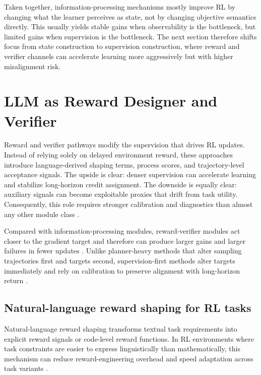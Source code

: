 \documentclass[pdflatex,sn-mathphys-num]{sn-jnl}
\begin{document}
Taken together, information-processing mechanisms mostly improve RL by changing what the learner perceives as state, not by changing objective semantics directly. This usually yields stable gains when observability is the bottleneck, but limited gains when supervision is the bottleneck. The next section therefore shifts focus from state construction to supervision construction, where reward and verifier channels can accelerate learning more aggressively but with higher misalignment risk.
\section{LLM as Reward Designer and Verifier}
Reward and verifier pathways modify the supervision that drives RL updates. Instead of relying solely on delayed environment reward, these approaches introduce language-derived shaping terms, process scores, and trajectory-level acceptance signals. The upside is clear: denser supervision can accelerate learning and stabilize long-horizon credit assignment. The downside is equally clear: auxiliary signals can become exploitable proxies that drift from task utility. Consequently, this role requires stronger calibration and diagnostics than almost any other module class \cite{arxiv_p_2310_12931,arxiv_p_2602_06493,arxiv_p_2602_12579,arxiv_p_2510_20867,arxiv_p_2512_05686,arxiv_p_2602_09367}.

Compared with information-processing modules, reward-verifier modules act closer to the gradient target and therefore can produce larger gains and larger failures in fewer updates \cite{arxiv_p_2205_12258,arxiv_p_2404_03648,arxiv_p_2602_00994}. Unlike planner-heavy methods that alter sampling trajectories first and targets second, supervision-first methods alter targets immediately and rely on calibration to preserve alignment with long-horizon return \cite{arxiv_p_2204_01691,arxiv_p_2305_16291,arxiv_p_2602_07848}.

\subsection{Natural-language reward shaping for RL tasks}
Natural-language reward shaping transforms textual task requirements into explicit reward signals or code-level reward functions. In RL environments where task constraints are easier to express linguistically than mathematically, this mechanism can reduce reward-engineering overhead and speed adaptation across task variants \cite{arxiv_p_2310_12931,arxiv_p_2309_11489,arxiv_p_2309_06687,doi_p_10_3390_app14198868}.
\end{document}
